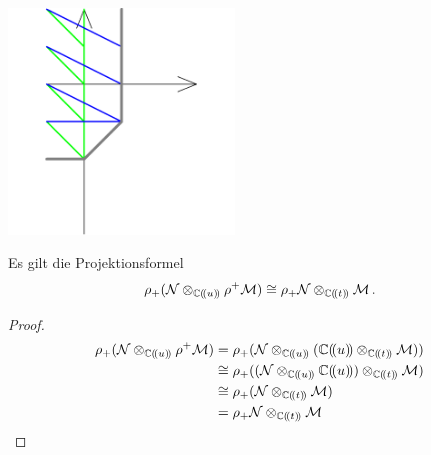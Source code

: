 \begin{exmp}
\begin{minipage}[hbt]{0,59\textwidth}
    \begin{center}
      \includegraphics[width=6cm]{img/pf-end.png}
    \end{center}
  \end{minipage}
\end{exmp}

\begin{thm} \label{thm:Projektionsformel}
  \cite[1.a]{sabbah_Fourier-local}
  Es gilt die Projektionsformel
  \begin{equation} \label{eq:Projektionsformel}
    \rho_+(\mathcal{N}\otimes_{\mathbb{C}(\!(u)\!)}\rho^+\mathcal{M}) \cong
    \rho_+\mathcal{N}\otimes_{\mathbb{C}(\!(t)\!)}\mathcal{M}\,.
  \end{equation}
\end{thm}
\begin{proof}
  \begin{align*}
    \rho_+(\cN\otimes_{\C(\!(u)\!)}\rho^+\cM) &=
    \rho_+(\cN\otimes_{\C(\!(u)\!)}(\C(\!(u)\!)\otimes_{\C(\!(t)\!)}\cM)) \\
    &\cong \rho_+((\cN\otimes_{\C(\!(u)\!)}\C(\!(u)\!))
    \otimes_{\C(\!(t)\!)}\cM) \\
    &\cong \rho_+(\cN\otimes_{\C(\!(t)\!)}\cM) \\
    &= \rho_+\cN\otimes_{\C(\!(t)\!)}\cM \\
  \end{align*}
\end{proof}


